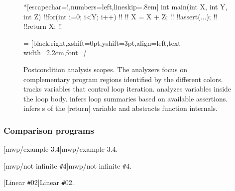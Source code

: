 \begin{figure}[H]
\begin{center}
\begin{outlisting}*[escapechar=!,numbers=left,lineskip=.8em]
int main(int X, int Y, int Z) {
    !!for(int i=0; i<Y; i++)              !!
    !!   X = X + Z;                       !!
    !!assert(...);                        !!
    !!return X;                           !!
}
\end{outlisting}
 = [black,right,xshift=0pt,yshift=3pt,align=left,text width=2.2cm,font=\itshape]
\end{center}
\caption[Postcondition analysis scopes]{
Postcondition analysis scopes.
The analyzers focus on complementary program regions identified by the different colors.
 tracks variables that control loop iteration.
\impl analyzes variables inside the loop body.
 infers loop summaries based on available assertions.
 infers s of the \pr|return| variable and abstracts function internals.
}
\label{fig:comp-scope}
\end{figure}%

\subsubsection{Comparison programs}
\label{subsec:comparison-programs}

\begin{center}
\begin{minipage}[t]{.47\textwidth}
\captionsetup{type=lstlisting}
[mwp/example 3.4]{mwp/example 3.4.}
\label{lst:ex34}
\end{minipage}\hfill
\begin{minipage}[t]{.47\textwidth}
\captionsetup{type=lstlisting}
[mwp/not infinite \texttt{\#}4]{mwp/not infinite \texttt{\#}4.}
\label{lst:ni4}
\end{minipage}
\end{center}%
\begin{center}
\begin{minipage}[t]{.47\textwidth}
\captionsetup{type=lstlisting}
[Linear \texttt{\#}02]{Linear \texttt{\#}02.}
\label{lst:l2}
\end{minipage}
\end{center}

